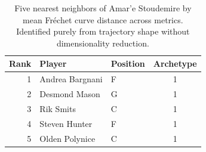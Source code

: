 \begin{table}[htbp]
  \centering\small
  \begin{tabular}{rllc}
    \toprule
    Rank & Player & Position & Archetype \\
    \midrule
    1 & Andrea Bargnani & F & 1 \\
    2 & Desmond Mason & G & 1 \\
    3 & Rik Smits & C & 1 \\
    4 & Steven Hunter & F & 1 \\
    5 & Olden Polynice & C & 1 \\
    \bottomrule
  \end{tabular}
  \caption{Five nearest neighbors of Amar'e Stoudemire by mean Fr\'{e}chet curve distance across metrics. Identified purely from trajectory shape without dimensionality reduction.}
  \label{tab:Amar_e_Stoudemire_frechet_curve_neighbors}
\end{table}


